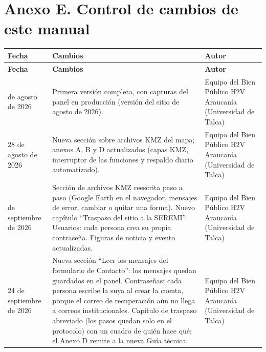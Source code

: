 \documentclass[11pt,letterpaper]{report}
\begin{document}
\section{Anexo E. Control de cambios de este manual}
\begin{longtable}{>{\raggedright\arraybackslash}p{}>{\raggedright\arraybackslash}p{}>{\raggedright\arraybackslash}p{}}
\rowcolor{h2vazul}\textbf{\color{white}Fecha} & \textbf{\color{white}Cambios} & \textbf{\color{white}Autor} \\
\endfirsthead
\rowcolor{h2vazul}\textbf{\color{white}Fecha} & \textbf{\color{white}Cambios} & \textbf{\color{white}Autor} \\
\endhead
21 de agosto de 2026 & Primera versión completa, con capturas del panel en producción (versión del sitio de agosto de 2026). & Equipo del Bien Público H2V Araucanía (Universidad de Talca) \\ \midrule
\rowcolor{filaalt}28 de agosto de 2026 & Nueva sección sobre archivos KMZ del mapa; anexos A, B y D actualizados (capas KMZ, interruptor de las funciones y respaldo diario automatizado). & Equipo del Bien Público H2V Araucanía (Universidad de Talca) \\ \midrule
23 de septiembre de 2026 & Sección de archivos KMZ reescrita paso a paso (Google Earth en el navegador, mensajes de error, cambiar o quitar una forma). Nuevo capítulo “Traspaso del sitio a la SEREMI”. Usuarios: cada persona crea su propia contraseña. Figuras de noticia y evento actualizadas. & Equipo del Bien Público H2V Araucanía (Universidad de Talca) \\ \midrule
\rowcolor{filaalt}24 de septiembre de 2026 & Nueva sección “Leer los mensajes del formulario de Contacto”: los mensajes quedan guardados en el panel. Contraseñas: cada persona escribe la suya al crear la cuenta, porque el correo de recuperación aún no llega a correos institucionales. Capítulo de traspaso abreviado (los pasos quedan solo en el protocolo) con un cuadro de quién hace qué; el Anexo D remite a la nueva Guía técnica. & Equipo del Bien Público H2V Araucanía (Universidad de Talca) \\ \bottomrule
\end{longtable}
\end{document}
